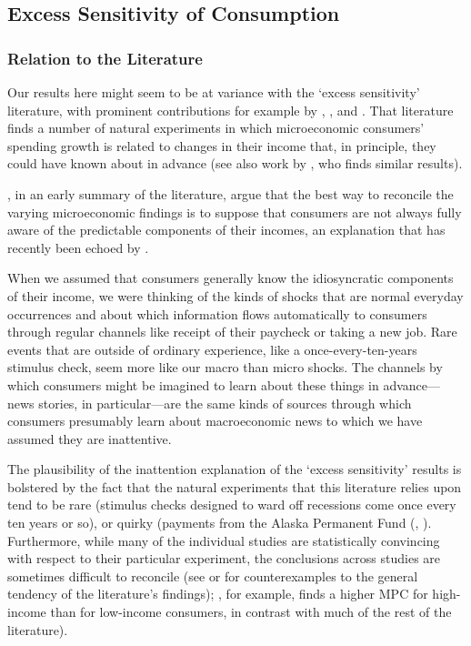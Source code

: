 \documentclass[titlepage]{./econtex}
\begin{document}

\subsection{Excess Sensitivity of Consumption} \label{sec:ExcessSens}

\subsubsection{Relation to the Literature}

Our results here might seem to be at variance with the `excess sensitivity' literature, with prominent contributions for example by \cite{soulelesTaxRefunds}, \cite{jpsTax}, and \cite{psjmMPC2008}.  That literature finds a number of natural experiments in which microeconomic consumers' spending growth is related to changes in their income that, in principle, they could have known about in advance (see also work by \cite{kuengTaxnews}, who finds similar results).

\cite{BrowningColladoAER}, in an early summary of the literature, argue that the best way to reconcile the varying microeconomic findings is to suppose that consumers are not always fully aware of the predictable components of their incomes, an explanation that has recently been echoed by \cite{parker25million}.

When we assumed that consumers generally know the idiosyncratic components of their income, we were thinking of the kinds of shocks that are normal everyday occurrences and about which information flows automatically to consumers through regular channels like receipt of their paycheck or taking a new job.  Rare events that are outside of ordinary experience, like a once-every-ten-years stimulus check, seem more like our macro than micro shocks.  The channels by which consumers might be imagined to learn about these things in advance---news stories, in particular---are the same kinds of sources through which consumers presumably learn about macroeconomic news to which we have assumed they are inattentive. 

The plausibility of the inattention explanation of the `excess sensitivity' results is bolstered by the fact that the natural experiments that this literature relies upon tend to be rare (stimulus checks designed to ward off recessions come once every ten years or so), or quirky (payments from the Alaska Permanent Fund (\cite{hsiehAlaska}, \cite{kuengAlaska}).  Furthermore, while many of the individual studies are statistically convincing with respect to their particular experiment, the conclusions across studies are sometimes difficult to reconcile (see \cite{hsiehAlaska} or \cite{CoulibalyLiMortgage} for counterexamples to the general tendency of the literature's findings); \cite{kuengAlaska}, for example, finds a higher MPC for high-income than for low-income consumers, in contrast with much of the rest of the literature).
\end{document}
